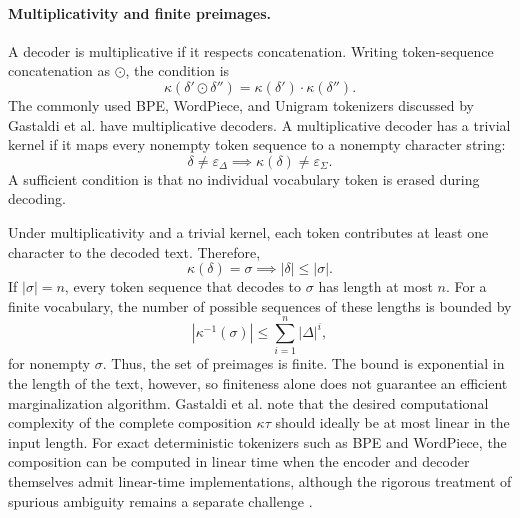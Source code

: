 \paragraph{Multiplicativity and finite preimages.}
A decoder is multiplicative if it respects concatenation. Writing token-sequence concatenation as \(\odot\), the condition is
\begin{equation}
    \kappa(\delta'\odot\delta'')
    =
    \kappa(\delta')\cdot\kappa(\delta'').
    \label{eq:tokenizer-multiplicative}
\end{equation}
The commonly used BPE, WordPiece, and Unigram tokenizers discussed by Gastaldi et al. have multiplicative decoders. A multiplicative decoder has a trivial kernel if it maps every nonempty token sequence to a nonempty character string:
\begin{equation}
    \delta\neq\varepsilon_\Delta
    \implies
    \kappa(\delta)\neq\varepsilon_\Sigma.
    \label{eq:tokenizer-trivial-kernel}
\end{equation}
A sufficient condition is that no individual vocabulary token is erased during decoding.

Under multiplicativity and a trivial kernel, each token contributes at least one character to the decoded text. Therefore,
\begin{equation}
    \kappa(\delta)=\sigma
    \implies
    |\delta|\leq|\sigma|.
    \label{eq:tokenizer-preimage-length}
\end{equation}
If \(|\sigma|=n\), every token sequence that decodes to \(\sigma\) has length at most \(n\). For a finite vocabulary, the number of possible sequences of these lengths is bounded by
\begin{equation}
    |\kappa^{-1}(\sigma)|
    \leq
    \sum_{i=1}^{n}|\Delta|^i,
    \label{eq:tokenizer-preimage-bound}
\end{equation}
for nonempty \(\sigma\). Thus, the set of preimages is finite. The bound is exponential in the length of the text, however, so finiteness alone does not guarantee an efficient marginalization algorithm. Gastaldi et al. note that the desired computational complexity of the complete composition \(\kappa\tau\) should ideally be at most linear in the input length. For exact deterministic tokenizers such as BPE and WordPiece, the composition can be computed in linear time when the encoder and decoder themselves admit linear-time implementations, although the rigorous treatment of spurious ambiguity remains a separate challenge \parencite{gastaldi2025foundations}.


